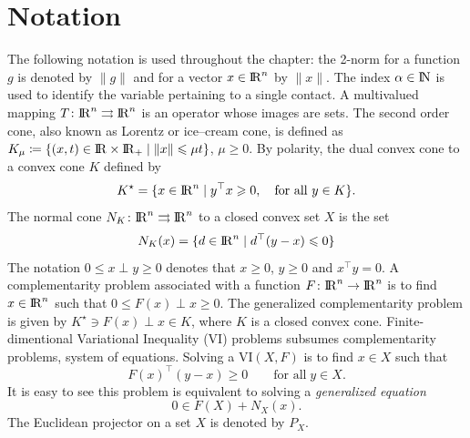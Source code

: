 \newcommand{\tb}[1]{\textcolor{blue}{#1}}
\newcommand{\tg}[1]{\textcolor{applegreen}{#1}}
\newcommand{\moh}[1]{\textcolor{applegreen}{#1}}
\newcommand{\MM}[0]{\rightrightarrows}









\section*{Notation}

The following notation is used throughout the chapter: the 2-norm for a function $g$ is denoted  by $\|g\|$ and for a vector $x\in\mathrm{I\!R}^n$ by $\|x\|$. 
The index $\alpha\in\mathrm{I\!N}$ is used to identify the variable pertaining to a single contact.
A multivalued mapping $T\colon\RR^n\MM\RR^n$ is an operator whose images are sets.
The second order cone, also known as Lorentz or ice--cream cone, is defined as $K_\mu \coloneqq\{(x, t)\in\mathrm{I\!R}\times\mathrm{I\!R}_+\mid \|x\|\leqslant \mu t\}$, $\mu\geq0$.
By polarity, the dual convex cone to a convex cone $K$ defined by
\begin{equation}
  \label{eq:dual-cone}
  K^\star = \{x \in \RR^n \mid  y^\top x \geq 0, \quad \text{for all } y \in K\}.
\end{equation}
The normal cone $N_K\colon\RR^n\MM\RR^n$ to a closed convex set $X$ is the set
\begin{equation}
 N_K(x) = \{d\in\mathrm{I\!R}^n\mid d^\top(y - x) \leqslant 0\}
\end{equation}
The notation $0\leq x\perp y\geq 0$ denotes that $x\geq0$, $y\geq0$ and $x^\top y = 0$.
A complementarity problem associated with a function $F\colon \mathrm{I\!R}^n\to\mathrm{I\!R}^n$ is to find $x\in\mathrm{I\!R}^n$ such that $0\leq F(x) \perp x \geq 0$.
The generalized complementarity problem is given by $K^\star\ni F(x) \perp x \in K$, where $K$ is a closed convex cone.
Finite-dimentional Variational Inequality (VI) problems subsumes complementarity problems, system of equations.
Solving a $\mathrm{VI}(X,F)$ is to find $x\in X$ such that
%
\begin{equation}
 F(x)^\top(y - x)\geq 0\qquad\text{for all}\; y\in X.
\end{equation}
%
It is easy to see this problem is equivalent to solving a \emph{generalized equation}
\begin{equation}
 0 \in F(X) + N_X(x).
\end{equation}
The Euclidean projector on a set $X$ is denoted by $P_X$.

